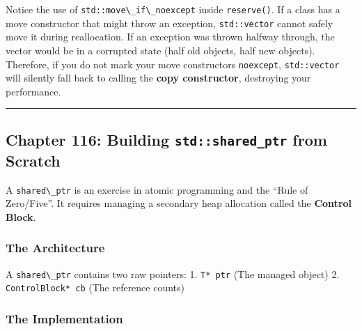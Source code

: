 Notice the use of \passthrough{\lstinline!std::move\_if\_noexcept!}
inside \passthrough{\lstinline!reserve()!}. If a class has a move
constructor that might throw an exception,
\passthrough{\lstinline!std::vector!} cannot safely move it during
reallocation. If an exception was thrown halfway through, the vector
would be in a corrupted state (half old objects, half new objects).
Therefore, if you do not mark your move constructors
\passthrough{\lstinline!noexcept!},
\passthrough{\lstinline!std::vector!} will silently fall back to calling
the \textbf{copy constructor}, destroying your performance.

\begin{center}\rule{0.5\linewidth}{0.5pt}\end{center}

\hypertarget{chapter-116-building-stdshared_ptr-from-scratch}{%
\subsection{\texorpdfstring{Chapter 116: Building
\texttt{std::shared\_ptr} from
Scratch}{Chapter 116: Building std::shared\_ptr from Scratch}}\label{chapter-116-building-stdshared_ptr-from-scratch}}

A \passthrough{\lstinline!shared\_ptr!} is an exercise in atomic
programming and the ``Rule of Zero/Five''. It requires managing a
secondary heap allocation called the \textbf{Control Block}.

\hypertarget{the-architecture}{%
\subsubsection{The Architecture}\label{the-architecture}}

A \passthrough{\lstinline!shared\_ptr!} contains two raw pointers: 1.
\passthrough{\lstinline!T* ptr!} (The managed object) 2.
\passthrough{\lstinline!ControlBlock* cb!} (The reference counts)

\hypertarget{the-implementation-1}{%
\subsubsection{The Implementation}\label{the-implementation-1}}

